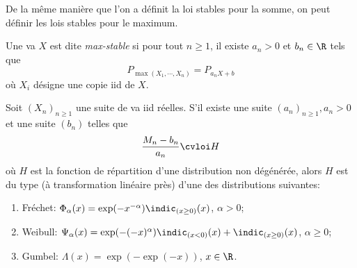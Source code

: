 \documentclass[10p,a4paper,reqno,titlepage]{report}
\begin{document}
De la même manière que l'on a définit la loi stables pour la somme, on peut définir les lois stables pour le maximum.
\begin{de}
	Une va $X$ est dite \textit{max-stable} si pour tout $n \geq 1$, il existe $a_n >0$ et $b_n \in \R$ tels que 
	$$P_{\max(X_1,\cdots,X_n)} =P_{a_n X +b}$$
	où $X_i$ désigne une copie iid de $X$.
\end{de}
\begin{thm}
Soit $(X_n)_{n\geq 1}$ une suite de va iid réelles. S'il existe une suite $(a_n)_{n\geq 1}, a_n >0$ et une suite $(b_n)$ telles que 
\begin{align} \frac{M_n - b_n}{a_n} \cvloi H  \label{FTC}
\end{align}
où $H$ est la fonction de répartition d'une distribution non dégénérée, alors $H$ est du type (à transformation linéaire près) d'une des distributions suivantes:\
\begin{enumerate}
	\item Fréchet: $\Phi_\alpha (x)= \exp(-x^{-\alpha}) \indic_{(x\geq 0)} (x)$, $\alpha >0$;
	\item Weibull: $\Psi_\alpha (x) = \exp(-(-x)^\alpha) \indic_{(x<0)}(x) + \indic_{(x \geq 0)}(x)$, $\alpha \geq 0$;
	\item Gumbel: $\Lambda(x)= \exp(-\exp(-x))$, $x\in \R$.
\end{enumerate}
\end{thm}	
\end{document}
